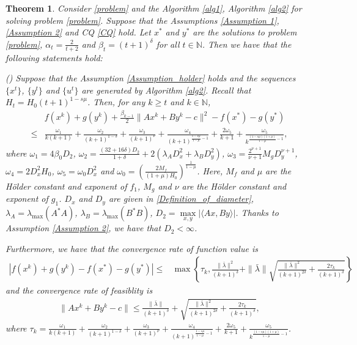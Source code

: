 \documentclass{article}
\numberwithin{equation}{section}
\newtheorem{theorem}{Theorem}[section]
\begin{document}
\begin{theorem} \label{theorem_f+beta_h}
    Consider \eqref{problem} and the Algorithm \ref{alg1}, Algorithm \ref{alg2} for solving problem \eqref{problem}. 
    Suppose that the Assumptions \ref{Assumption 1}, \ref{Assumption 2} 
    and CQ \eqref{CQ} hold. Let $x^*$ and $y^*$ are the solutions to problem \eqref{problem}, 
    $\alpha_t=\frac{2}{t+2}$ and $\beta_{t} =(t+1)^{\delta}$ for all $t\in \mathbb{N}$. 
    Then we have that the following statements hold:

    () Suppose that the Assumption \ref{Assumption_holder} holds and the sequences 
    $\{x^t\}$, $\{y^t\}$ and $\{u^t\}$ are generated by Algorithm \ref{alg2}. Recall that 
    $H_t = H_0(t+1)^{1-s\mu}$. Then, for any $k\geq t$ and $k\in \mathbb{N}$, 
    \begin{align}
        &f(x^{k}) + g(y^{k}) +\frac{\beta_{k-1}}{2}\|Ax^k+By^k-c\rVert^2 - f(x^*) -g(y^*)  \nonumber \\
        \leq& \frac{\omega_1}{k(k+1)}+ \frac{\omega_2}{(k+1)^{1-\delta}}+ \frac{\omega_3}{(k+1)^{\nu}} 
        + \frac{\omega_4}{(k+1)^{\frac{1-s\mu}{1-\mu}-1}}+ \frac{2\omega_5}{k+1}+ \frac{\omega_5}{k^{\frac{(1-s\mu)(1+\mu)}{1-\mu}-1}}, 
        \nonumber
    \end{align}
    where $\omega_1 = 4\beta_0D_2$, $\omega_2 = \frac{(32+16\delta)D_2}{1+\delta}+ 2(\lambda_AD_x^2+ \lambda_BD_y^2)$, 
    $\omega_3 = \frac{2^{\nu+1}}{\nu+1}M_gD_y^{\nu+1}$, $\omega_4 = 2D_x^2H_0$, $\omega_5 = \omega_0D_x^2$  
    and $\omega_0 = \left(\frac{2M_f}{(1+\mu)H_0}\right)^{\frac{1}{1-\mu}} $. Here, $M_f$ and $\mu$ are the 
    H\"older constant and exponent of $f_1$, $M_g$ and $\nu$ are the H\"older constant and exponent of $g_1$. 
    $D_x$ and $D_y$ are given in \eqref{Definition_of_diameter},    
    $\lambda_{A} =\lambda_{\max}(A^*A)$, $\lambda_{B} = \lambda_{\max}(B^*B)$, $D_2 = \max\limits_{x,y}\left| \langle Ax,By\rangle \right|$.
    Thanks to Assumption \ref{Assumption 2}, we have that $D_2 < \infty$. 

    Furthermore, we have that the convergence rate of function value is 
    \begin{align} \label{convergence_rate_function}
        \left|f(x^k)+ g(y^k) -f(x^*)-g(y^*) \right|
        \leq & \max\left\{ \tau_k, \frac{\|\bar{\lambda}\rVert^2}{(k+1)^{\delta}} + \|\bar{\lambda}\rVert\sqrt{\frac{\|\bar{\lambda}\rVert^2}{(k+1)^{2\delta}}+\frac{2\tau_k}{(k+1)^{\delta}}} \right\}
    \end{align}
    and the convergence rate of feasiblity is  
    \begin{align} \label{convergence_rate_feasiblity}
        \|Ax^k+By^k-c\rVert \leq \frac{\|\bar{\lambda}\rVert}{(k+1)^{\delta}} + \sqrt{\frac{\|\bar{\lambda}\rVert^2}{(k+1)^{2\delta}}+\frac{2\tau_k}{(k+1)^{\delta}}}, 
    \end{align}
    where $\tau_k = \frac{\omega_1}{k(k+1)}+ \frac{\omega_2}{(k+1)^{1-\delta}}+ \frac{\omega_3}{(k+1)^{\nu}} 
        + \frac{\omega_4}{(k+1)^{\frac{1-s\mu}{1-\mu}-1}}+ \frac{2\omega_5}{k+1}+ \frac{\omega_5}{k^{\frac{(1-s\mu)(1+\mu)}{1-\mu}-1}}$. 
    

\end{theorem}
\end{document}
